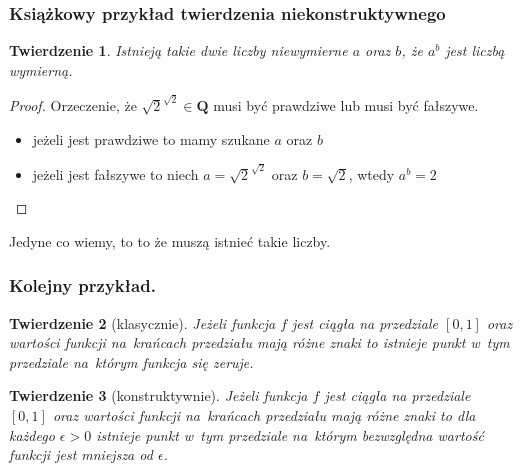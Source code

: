 \documentclass{beamer}
\newtheorem{thm}{Twierdzenie}
\begin{document}

\begin{frame}
\frametitle{Książkowy przykład twierdzenia niekonstruktywnego}

\begin{thm}
 Istnieją takie dwie liczby niewymierne $a$ oraz $b$, że $a^b$ jest liczbą wymierną.
\end{thm}

\begin{proof}
 Orzeczenie, że $\sqrt{2}^{\sqrt{2}} \in \mathbf{Q}$ musi być prawdziwe lub musi być fałszywe.
\begin{itemize}
 \item jeżeli jest prawdziwe to mamy szukane $a$ oraz $b$
 \item jeżeli jest fałszywe to niech $a = \sqrt{2}^{\sqrt{2}}$ oraz $b = \sqrt{2}$, wtedy $a^b = 2$
\end{itemize}

\end{proof}

Jedyne co wiemy, to to że muszą istnieć takie liczby. 

\end{frame}


\begin{frame}
\frametitle{Kolejny przykład.}

\begin{thm}[klasycznie]
 Jeżeli funkcja $f$ jest ciągła na przedziale $[0, 1]$ oraz wartości funkcji na~krańcach przedziału mają różne znaki
to istnieje punkt w~tym przedziale na~którym funkcja się zeruje.
\end{thm}

\begin{thm}[konstruktywnie]
 Jeżeli funkcja $f$ jest ciągła na przedziale $[0, 1]$ oraz wartości funkcji na~krańcach przedziału mają różne znaki
to dla każdego $\epsilon > 0$ istnieje punkt w~tym przedziale na~którym bezwzględna wartość funkcji jest mniejsza od
$\epsilon$.
\end{thm}

\end{frame}

\end{document}

